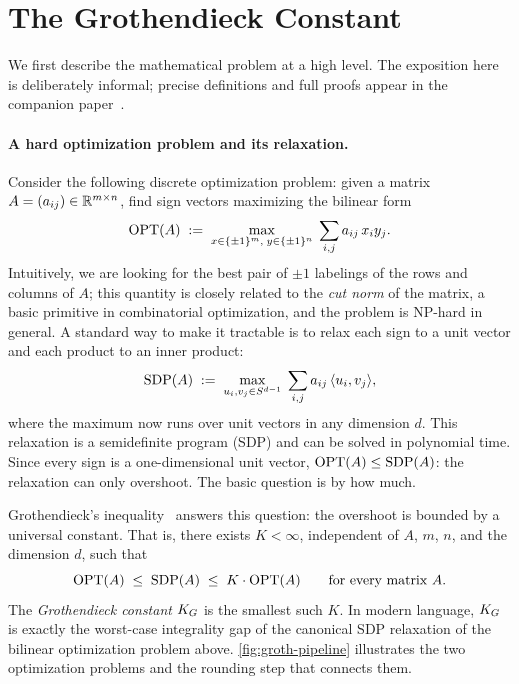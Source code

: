 \section{The Grothendieck Constant}
\label{sec:grothendieck}

We first describe the mathematical problem at a high level. The exposition here is deliberately informal; precise definitions and full proofs appear in the companion paper~\cite{saha2026new}.

\paragraph{A hard optimization problem and its relaxation.}
Consider the following discrete optimization problem: given a matrix $A=(a_{ij})\in\mathbb{R}^{m\times n}$, find sign vectors maximizing the bilinear form
\[
    \operatorname{OPT}(A)
    \;:=\;
    \max_{x\in\{\pm1\}^m,\; y\in\{\pm1\}^n}
    \;\sum_{i,j} a_{ij}\, x_i y_j.
\]
Intuitively, we are looking for the best pair of $\pm1$ labelings of the rows and columns of $A$; this quantity is closely related to the \emph{cut norm} of the matrix, a basic primitive in combinatorial optimization, and the problem is NP-hard in general.
A standard way to make it tractable is to relax each sign to a unit vector and each product to an inner product:
\[
    \operatorname{SDP}(A)
    \;:=\;
    \max_{u_i, v_j \in S^{d-1}}
    \;\sum_{i,j} a_{ij}\, \langle u_i,v_j\rangle,
\]
where the maximum now runs over unit vectors in any dimension $d$.
This relaxation is a semidefinite program (SDP) and can be solved in polynomial time.
Since every sign is a one-dimensional unit vector, $\operatorname{OPT}(A)\le\operatorname{SDP}(A)$: the relaxation can only overshoot.
The basic question is by how much.

Grothendieck's inequality~\cite{Gro53,LP68} answers this question: the overshoot is bounded by a universal constant.
That is, there exists $K<\infty$, independent of $A$, $m$, $n$, and the dimension $d$, such that
\[
    \operatorname{OPT}(A)
    \;\le\;
    \operatorname{SDP}(A)
    \;\le\;
    K\cdot\operatorname{OPT}(A)
    \qquad
    \text{for every matrix } A.
\]
The \emph{Grothendieck constant} $K_G$ is the smallest such $K$.
In modern language, $K_G$ is exactly the worst-case integrality gap of the canonical SDP relaxation of the bilinear optimization problem above.
\cref{fig:groth-pipeline} illustrates the two optimization problems and the rounding step that connects them.

